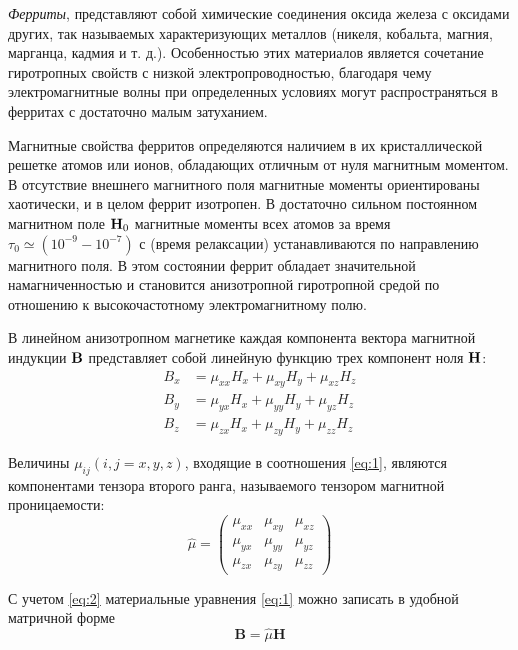 \textit{Ферриты}, представляют собой химические соединения оксида железа с оксидами других, так называемых характеризующих
металлов (никеля, кобальта, магния, марганца, кадмия и т. д.). Особенностью этих материалов является сочетание
гиротропных свойств с низкой электропроводностью, благодаря чему электромагнитные волны при определенных условиях могут
распространяться в ферритах с достаточно малым затуханием.

Магнитные свойства ферритов определяются наличием в их кристаллической решетке атомов или ионов, обладающих отличным от
нуля магнитным моментом. В отсутствие внешнего магнитного поля магнитные моменты ориентированы хаотически, и в целом
феррит изотропен. В достаточно сильном постоянном магнитном поле $\textbf{H}_0$ магнитные моменты всех атомов за время
$\tau_0 \simeq (10^{-9} - 10^{-7})$ с (время релаксации) устанавливаются по направлению магнитного поля. В этом состоянии феррит обладает
значительной намагниченностью и становится анизотропной гиротропной средой по отношению к высокочастотному электромагнитному полю.

В линейном анизотропном магнетике каждая компонента вектора магнитной индукции $\textbf{B}$ представляет собой линейную функцию
трех компонент ноля $\textbf{H}$:
\begin{equation}
    \begin{aligned} 
        B_{x} &=\mu_{x x} H_{x}+\mu_{x y} H_{y}+\mu_{x z} H_{z} \\
        B_{y} &=\mu_{y x} H_{x}+\mu_{y y} H_{y}+\mu_{y z} H_{z} \\
        B_{z} &=\mu_{z x} H_{x}+\mu_{z y} H_{y}+\mu_{z z} H_{z}
    \end{aligned}
    \label{eq:1}
\end{equation}

Величины $\mu_{i j}(i,j=x,y,z)$, входящие в соотношения \eqref{eq:1}, являются компонентами тензора второго ранга, называемого
тензором магнитной проницаемости:
\begin{equation}
    \hat{\mu}=\left(\begin{array}
        {ccc}{\mu_{x x}} & {\mu_{x y}} & {\mu_{x z}} \\
        {\mu_{y x}} & {\mu_{y y}} & {\mu_{y z}} \\
        {\mu_{z x}} & {\mu_{z y}} & {\mu_{z z}}
    \end{array}\right)
    \label{eq:2}
\end{equation}


С учетом \eqref{eq:2} материальные уравнения \eqref{eq:1} можно записать в удобной матричной форме
\begin{equation}
    \textbf{B} = \hat{\mu}\textbf{H}
    \label{eq:3}
\end{equation}

